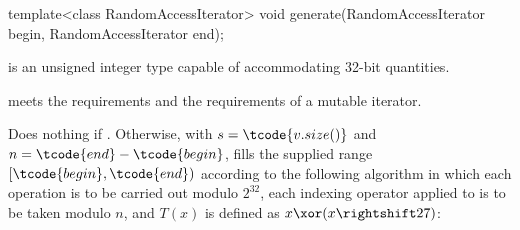 %
\begin{itemdecl}
template<class RandomAccessIterator>
  void generate(RandomAccessIterator begin, RandomAccessIterator end);
\end{itemdecl}

\begin{itemdescr}
\pnum
\mandates
  is an unsigned integer type capable of accommodating 32-bit quantities.

\pnum
\expects
   meets the
   requirements
  and the requirements of a mutable iterator.

\pnum
\effects
 Does nothing if .
 Otherwise,
 with $s = \tcode{v.size()}$
 and  $n = \tcode{end} - \tcode{begin}$,
 fills the supplied range $[\tcode{begin},\tcode{end})$
 according to the following algorithm
 in which
 each operation is to be carried out modulo $2^{32}$,
 each indexing operator applied to  is to be taken modulo $n$,
 and $T(x)$ is defined as $x \xor (x \rightshift 27)$:


\end{itemdescr}
